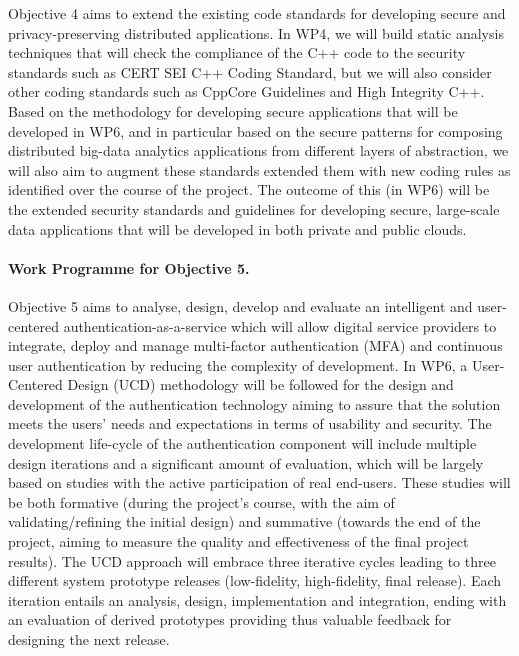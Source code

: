 \documentclass[a4paper,11pt]{article}
\begin{document}
Objective 4 aims to extend the existing code standards for developing secure and privacy-preserving distributed applications. In WP4, we will build static analysis techniques that will check the compliance of the C++ code to the security standards such as CERT SEI C++ Coding Standard, but we will also consider other coding standards such as CppCore Guidelines and High Integrity C++. Based on the methodology for developing secure applications that will be developed in WP6, and in particular based on the secure patterns for composing distributed big-data analytics applications from different layers of abstraction, we will also aim to augment these standards extended them with new coding rules as identified over the course of the project. The outcome of this (in WP6) will be the extended security standards and guidelines for developing secure, large-scale data applications that will be developed in both private and public clouds.

\paragraph{Work Programme for Objective 5.}

Objective 5 aims to analyse, design, develop and evaluate an intelligent and user-centered authentication-as-a-service which will allow digital service providers to integrate, deploy and manage multi-factor authentication (MFA) and continuous user authentication by reducing the complexity of development. In WP6, a User-Centered Design (UCD) methodology will be followed for the design and development of the authentication technology aiming to assure that the solution meets the users' needs and expectations in terms of usability and security. The development life-cycle of the authentication component will include multiple design iterations and a significant amount of evaluation, which will be largely based on studies with the active participation of real end-users. These studies will be both formative (during the project’s course, with the aim of validating/refining the initial design) and summative (towards the end of the project, aiming to measure the quality and effectiveness of the final project results). The UCD approach will embrace three iterative cycles leading to three different system prototype releases (low-fidelity, high-fidelity, final release). Each iteration entails an analysis, design, implementation and integration, ending with an evaluation of derived prototypes providing thus valuable feedback for designing the next release. 
\end{document}
